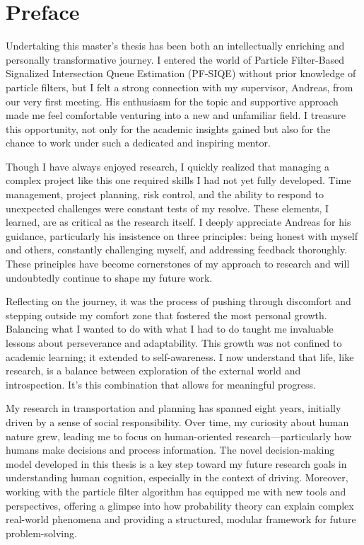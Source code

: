 \chapter*{Preface}


Undertaking this master's thesis has been both an intellectually enriching and personally transformative journey. I entered the world of Particle Filter-Based Signalized Intersection Queue Estimation (PF-SIQE) without prior knowledge of particle filters, but I felt a strong connection with my supervisor, Andreas, from our very first meeting. His enthusiasm for the topic and supportive approach made me feel comfortable venturing into a new and unfamiliar field. I treasure this opportunity, not only for the academic insights gained but also for the chance to work under such a dedicated and inspiring mentor.

Though I have always enjoyed research, I quickly realized that managing a complex project like this one required skills I had not yet fully developed. Time management, project planning, risk control, and the ability to respond to unexpected challenges were constant tests of my resolve. These elements, I learned, are as critical as the research itself. I deeply appreciate Andreas for his guidance, particularly his insistence on three principles: being honest with myself and others, constantly challenging myself, and addressing feedback thoroughly. These principles have become cornerstones of my approach to research and will undoubtedly continue to shape my future work.

Reflecting on the journey, it was the process of pushing through discomfort and stepping outside my comfort zone that fostered the most personal growth. Balancing what I wanted to do with what I had to do taught me invaluable lessons about perseverance and adaptability. This growth was not confined to academic learning; it extended to self-awareness. I now understand that life, like research, is a balance between exploration of the external world and introspection. It’s this combination that allows for meaningful progress.

My research in transportation and planning has spanned eight years, initially driven by a sense of social responsibility. Over time, my curiosity about human nature grew, leading me to focus on human-oriented research—particularly how humans make decisions and process information. The novel decision-making model developed in this thesis is a key step toward my future research goals in understanding human cognition, especially in the context of driving. Moreover, working with the particle filter algorithm has equipped me with new tools and perspectives, offering a glimpse into how probability theory can explain complex real-world phenomena and providing a structured, modular framework for future problem-solving.

